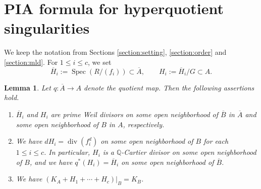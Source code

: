 \documentclass[a4paper,11pt]{amsart}
\newtheorem{lem}[thm]{Lemma}
\theoremstyle{definition}
\theoremstyle{remark}
\begin{document}
\section{PIA formula for hyperquotient singularities}\label{section:PIA}
We keep the notation from Sections \ref{section:setting}, \ref{section:order} and \ref{section:mld}. 
For $1 \le i \le c$, we set 
\[
\overline{H}_i := \operatorname{Spec} \left( R/(f_i) \right) \subset \overline{A}, \qquad 
H_i := \overline{H}_i/G \subset A.
\]


\begin{lem}\label{lem:property B_i}
Let $q:\overline{A} \to A$ denote the quotient map. 
Then the following assertions hold. 
\begin{enumerate}
\item
$\overline{H}_i$ and $H_i$  are prime Weil divisors on some open neighborhood of $\overline{B}$ in $\overline{A}$ and some open neighborhood of $B$ in $A$, respectively.

\item 
We have $d H_i = \operatorname{div} \left( f_i ^d \right)$ on some open neighborhood of $B$ for each $1 \le i \le c$. 
In particular, $H_i$ is a $\mathbb Q$-Cartier divisor on some open neighborhood of $B$, and we have $q^*(H_i)=\overline{H}_i$ on some open neighborhood of $\overline{B}$.

\item 
We have
$(K_A + H_1 + \cdots + H_c) |_B = K_B$. 
\end{enumerate}
\end{lem}
\end{document}
